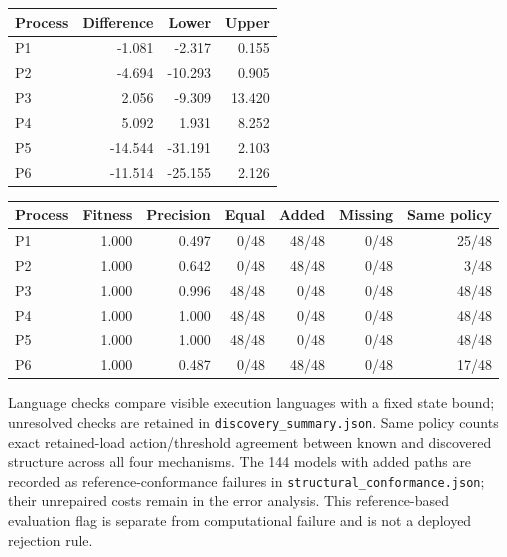 \begin{center}\small\begin{tabular}{lrrr}\toprule

Process & Difference & Lower & Upper\\\midrule

P1 & -1.081 & -2.317 & 0.155\\

P2 & -4.694 & -10.293 & 0.905\\

P3 & 2.056 & -9.309 & 13.420\\

P4 & 5.092 & 1.931 & 8.252\\

P5 & -14.544 & -31.191 & 2.103\\

P6 & -11.514 & -25.155 & 2.126\\

\bottomrule\end{tabular}\end{center}

\begin{center}\small\begin{tabular}{lrrrrrr}\toprule

Process & Fitness & Precision & Equal & Added & Missing & Same policy\\\midrule

P1 & 1.000 & 0.497 & 0/48 & 48/48 & 0/48 & 25/48\\

P2 & 1.000 & 0.642 & 0/48 & 48/48 & 0/48 & 3/48\\

P3 & 1.000 & 0.996 & 48/48 & 0/48 & 0/48 & 48/48\\

P4 & 1.000 & 1.000 & 48/48 & 0/48 & 0/48 & 48/48\\

P5 & 1.000 & 1.000 & 48/48 & 0/48 & 0/48 & 48/48\\

P6 & 1.000 & 0.487 & 0/48 & 48/48 & 0/48 & 17/48\\

\bottomrule\end{tabular}\end{center}

Language checks compare visible execution languages with a fixed state bound; unresolved checks are retained in \texttt{discovery\_summary.json}. Same policy counts exact retained-load action/threshold agreement between known and discovered structure across all four mechanisms. The 144 models with added paths are recorded as reference-conformance failures in \texttt{structural\_conformance.json}; their unrepaired costs remain in the error analysis. This reference-based evaluation flag is separate from computational failure and is not a deployed rejection rule.

